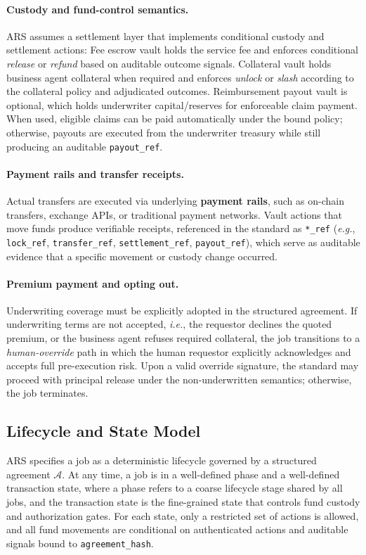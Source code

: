 \documentclass{article} %
\begin{document}
\paragraph{Custody and fund-control semantics.}
\textsc{ARS} assumes a settlement layer that implements conditional custody and settlement actions: Fee escrow vault holds the service fee and enforces conditional \emph{release} or \emph{refund} based on auditable outcome signals. Collateral vault holds business agent collateral when required and enforces \emph{unlock} or \emph{slash} according to the collateral policy and adjudicated outcomes. Reimbursement payout vault is optional, which holds underwriter capital/reserves for enforceable claim payment. When used, eligible claims can be paid automatically under the bound policy; otherwise, payouts are executed from the underwriter treasury while still producing an auditable \texttt{payout\_ref}.

\paragraph{Payment rails and transfer receipts.}
Actual transfers are executed via underlying \textbf{payment rails}, such as on-chain transfers, exchange APIs, or traditional payment networks. Vault actions that move funds produce verifiable receipts, referenced in the standard as \texttt{*\_ref} (\emph{e.g.}, \texttt{lock\_ref}, \texttt{transfer\_ref}, \texttt{settlement\_ref}, \texttt{payout\_ref}), which serve as auditable evidence that a specific movement or custody change occurred.

\paragraph{Premium payment and opting out.}
Underwriting coverage must be explicitly adopted in the structured agreement. If underwriting terms are not accepted, \emph{i.e.}, the requestor declines the quoted premium, or the business agent refuses required collateral, the job transitions to a \emph{human-override} path in which the human requestor explicitly acknowledges and accepts full pre-execution risk. Upon a valid override signature, the standard may proceed with principal release under the non-underwritten semantics; otherwise, the job terminates.


\subsection{Lifecycle and State Model}
\textsc{ARS} specifies a job as a deterministic lifecycle governed by a structured agreement $\mathcal{A}$. At any time, a job is in a well-defined phase and a well-defined transaction state, where a phase refers to a coarse lifecycle stage shared by all jobs, and the transaction state is the fine-grained state that controls fund custody and authorization gates. For each state, only a restricted set of actions is allowed, and all fund movements are conditional on authenticated actions and auditable signals bound to \texttt{agreement\_hash}.
\end{document}
